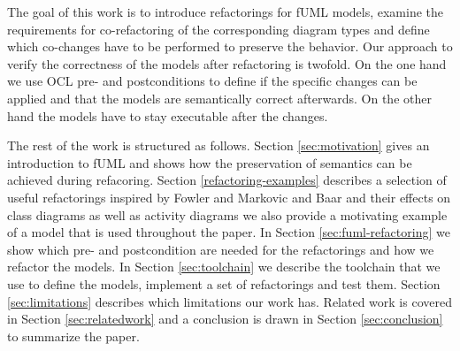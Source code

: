 \documentclass{llncs}
\begin{document}

The goal of this work is to introduce refactorings for fUML models, examine the requirements for co-refactoring of the
corresponding diagram types and define which co-changes have to be performed to preserve the behavior. Our approach to
verify
the correctness of the models after refactoring is twofold. On the one hand we use OCL pre- and postconditions
\cite{rob99} to define if the specific changes can be applied and that the models are semantically correct afterwards.
On the other hand the models have to stay executable after the changes.



The rest of the work is structured as follows. Section \ref{sec:motivation} gives an introduction to fUML and shows how 
the preservation of semantics can be achieved during refacoring. 
Section \ref{refactoring-examples} describes a selection of useful refactorings inspired by Fowler \cite{fow99} and 
Markovic and Baar \cite{DBLP:journals/sosym/MarkovicB08} and their effects on class diagrams as
well as activity diagrams we also provide a motivating example of a model that is used throughout the paper. In Section 
\ref{sec:fuml-refactoring} we show which pre- and postcondition are needed for the refactorings and
how we refactor the models. In Section \ref{sec:toolchain} we describe the toolchain that we use to define the models, 
implement a set of refactorings and test them. Section \ref{sec:limitations} describes which limitations our work has. 
Related work is covered in Section \ref{sec:relatedwork} and a conclusion is drawn in 
Section \ref{sec:conclusion} to summarize the paper.


\end{document}
